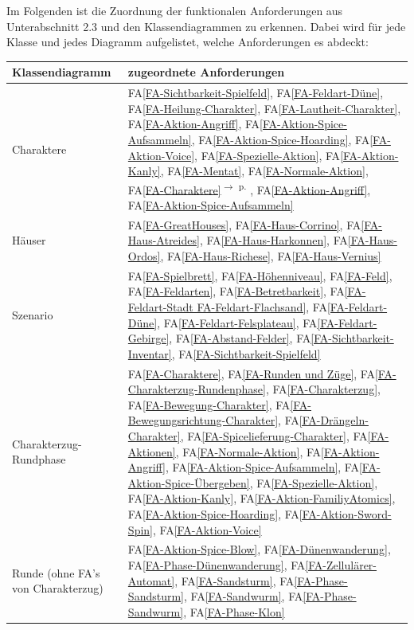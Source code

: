 \documentclass[12pt]{article}
\newcounter{fa}
\newcommand{\faref}[1]{FA\ref{#1}\textsuperscript{$\rightarrow$ p. \pageref{#1}}}
\newcommand{\mfaref}[1]{FA\ref{#1}}
\begin{document}
Im Folgenden ist die Zuordnung der funktionalen Anforderungen aus Unterabschnitt 2.3 und den
Klassendiagrammen zu erkennen. Dabei wird für jede Klasse und jedes Diagramm aufgelistet, welche Anforderungen es abdeckt:
\begin{tabularx}{\linewidth}{l|X}
	\textbf{Klassendiagramm} & \textbf{zugeordnete Anforderungen} \\
	\hline
	Charaktere & \mfaref{FA-Sichtbarkeit-Spielfeld},  \mfaref{FA-Feldart-Düne},   \mfaref{FA-Heilung-Charakter},   \mfaref{FA-Lautheit-Charakter},   \mfaref{FA-Aktion-Angriff},  \mfaref{FA-Aktion-Spice-Aufsammeln},  \mfaref{FA-Aktion-Spice-Hoarding},   \mfaref{FA-Aktion-Voice},   \mfaref{FA-Spezielle-Aktion},   \mfaref{FA-Aktion-Kanly}, \mfaref{FA-Mentat},  \mfaref{FA-Normale-Aktion},  \faref{FA-Charaktere},  \mfaref{FA-Aktion-Angriff},  \mfaref{FA-Aktion-Spice-Aufsammeln} \\
	Häuser & \mfaref{FA-GreatHouses}, \mfaref{FA-Haus-Corrino}, \mfaref{FA-Haus-Atreides}, \mfaref{FA-Haus-Harkonnen},  \mfaref{FA-Haus-Ordos}, \mfaref{FA-Haus-Richese}, \mfaref{FA-Haus-Vernius} \\
	Szenario & \mfaref{FA-Spielbrett}, \mfaref{FA-Höhenniveau}, \mfaref{FA-Feld},  \mfaref{FA-Feldarten}, \mfaref{FA-Betretbarkeit}, \mfaref{FA-Feldart-Stadt FA-Feldart-Flachsand}, \mfaref{FA-Feldart-Düne}, \mfaref{FA-Feldart-Felsplateau}, \mfaref{FA-Feldart-Gebirge}, \mfaref{FA-Abstand-Felder}, \mfaref{FA-Sichtbarkeit-Inventar}, \mfaref{FA-Sichtbarkeit-Spielfeld} \\
	Charakterzug-Rundphase & \mfaref{FA-Charaktere}, \mfaref{FA-Runden und Züge}, \mfaref{FA-Charakterzug-Rundenphase},  \mfaref{FA-Charakterzug},  \mfaref{FA-Bewegung-Charakter}, \mfaref{FA-Bewegungsrichtung-Charakter},  \mfaref{FA-Drängeln-Charakter}, \mfaref{FA-Spicelieferung-Charakter},  \mfaref{FA-Aktionen}, \mfaref{FA-Normale-Aktion}, \mfaref{FA-Aktion-Angriff}, \mfaref{FA-Aktion-Spice-Aufsammeln}, \mfaref{FA-Aktion-Spice-Übergeben}, \mfaref{FA-Spezielle-Aktion}, \mfaref{FA-Aktion-Kanly}, \mfaref{FA-Aktion-FamiliyAtomics}, \mfaref{FA-Aktion-Spice-Hoarding}, \mfaref{FA-Aktion-Sword-Spin}, \mfaref{FA-Aktion-Voice}  \\
	Runde (ohne FA's von Charakterzug) & \mfaref{FA-Aktion-Spice-Blow}, \mfaref{FA-Dünenwanderung}, \mfaref{FA-Phase-Dünenwanderung}, \mfaref{FA-Zellulärer-Automat}, \mfaref{FA-Sandsturm}, \mfaref{FA-Phase-Sandsturm}, \mfaref{FA-Sandwurm}, \mfaref{FA-Phase-Sandwurm}, \mfaref{FA-Phase-Klon} \\
\end{tabularx}

\vspace{0.5cm}
\end{document}
